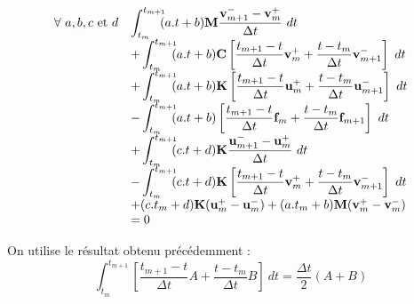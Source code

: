 \documentclass[12pt,a4paper]{report}
\begin{document}
\begin{equation}
\begin{array}{r l}
	\forall~a,b,c \text{ et }d
	&\displaystyle
		 \int_{t_m}^{t_{m+1}} \!\!\! 	(a.t+b)
			\mathbf{M}\frac{\mathbf{v}^-_{m+1} - \mathbf{v}^+_m}
							{\Delta t} ~dt
	\\ &\displaystyle
		 +\int_{t_m}^{t_{m+1}} \!\!\! 	(a.t+b)
			\mathbf{C}
				\left[
				\frac{t_{m+1}-t}{\Delta t} \mathbf{v}_m^+ + 
				\frac{t-t_m}{\Delta t} \mathbf{v}_{m+1}^- 
				\right] ~dt
	\\ &\displaystyle
		 +\int_{t_m}^{t_{m+1}} \!\!\! 	(a.t+b)
			\mathbf{K}
				\left[
				\frac{t_{m+1}-t}{\Delta t} \mathbf{u}_m^+ + 
				\frac{t-t_m}{\Delta t} \mathbf{u}_{m+1}^- 
				\right] ~dt
	\\ &\displaystyle
	   - \int_{t_m}^{t_{m+1}} \!\!\! 	(a.t+b)
				\left[
				\frac{t_{m+1}-t}{\Delta t} \mathbf{f}_m + 
				\frac{t-t_m}{\Delta t} \mathbf{f}_{m+1} 
				\right] ~dt
	\\ &\displaystyle	
	   + \int_{t_m}^{t_{m+1}} \!\!\! 
	    	(c.t+d) \mathbf{K}\frac{\mathbf{u}^-_{m+1} - \mathbf{u}^+_m}
	    							{\Delta t}~dt 
	\\ &\displaystyle
	    -\int_{t_m}^{t_{m+1}} \!\!\! 
	    	(c.t+d) \mathbf{K}
				\left[
				\frac{t_{m+1}-t}{\Delta t} \mathbf{v}_m^+ + 
				\frac{t-t_m}{\Delta t} \mathbf{v}_{m+1}^- 
				\right] ~dt
	\\
	  &+ (c.t_m+d) \mathbf{K} (\mathbf{u}_m^+ - \mathbf{u}_m^-)
	   +  (a.t_m+b) \mathbf{M}(\mathbf{v}_m^+ - \mathbf{v}_m^-)
	\\&=0
\end{array}
\end{equation}

On utilise le résultat obtenu précédemment :
\begin{equation}
\int_{t_m}^{t_{m+1}} \!\!\! 	
	\left[
		\frac{t_{m+1}-t}{\Delta t} A + 
		\frac{t-t_m}{\Delta t} B 
	\right] ~dt
= \frac{\Delta t}{2} (A+B)
\end{equation}
\end{document}

